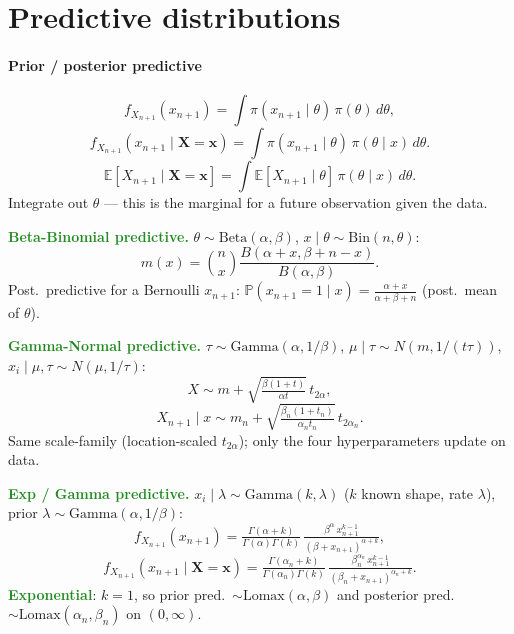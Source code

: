 
\section{Predictive distributions}

\paragraph{Prior / posterior predictive}
\[f_{X_{n+1}}(x_{n+1})=\int \pi(x_{n+1}\mid\theta)\,\pi(\theta)\,d\theta,\]
\[f_{X_{n+1}}(x_{n+1}\mid\mathbf{X}=\mathbf{x})=\int \pi(x_{n+1}\mid \theta)\,\pi(\theta\mid x)\,d\theta.\]
\[\mathbb{E}[X_{n+1}\mid\mathbf{X}=\mathbf{x}]=\int\mathbb{E}[X_{n+1}\mid\theta]\,\pi(\theta\mid x)\,d\theta.\]
\textcolor{Bittersweet}{Integrate out $\theta$} — this is the marginal for a future observation given the data.

\textcolor{ForestGreen}{\textbf{Beta-Binomial predictive.}} $\theta\sim\mathrm{Beta}(\alpha,\beta)$, $x\mid\theta\sim\mathrm{Bin}(n,\theta)$:
\[m(x)=\binom{n}{x}\frac{B(\alpha+x,\beta+n-x)}{B(\alpha,\beta)}.\]
Post.\ predictive for a Bernoulli $x_{n+1}$: $\mathbb{P}(x_{n+1}=1\mid x)=\tfrac{\alpha+x}{\alpha+\beta+n}$ (post.\ mean of $\theta$).

\textcolor{ForestGreen}{\textbf{Gamma-Normal predictive.}} $\tau\sim\mathrm{Gamma}(\alpha,1/\beta)$, $\mu\mid\tau\sim N(m,1/(t\tau))$, $x_i\mid\mu,\tau\sim N(\mu,1/\tau)$:
\[X\sim m+\!\sqrt{\tfrac{\beta(1+t)}{\alpha t}}\,t_{2\alpha},\]
\[X_{n+1}\mid x\sim m_n+\!\sqrt{\tfrac{\beta_n(1+t_n)}{\alpha_n t_n}}\,t_{2\alpha_n}.\]
\textcolor{Bittersweet}{Same scale-family} (location-scaled $t_{2\alpha}$); only the four hyperparameters update on data.

\textcolor{ForestGreen}{\textbf{Exp / Gamma predictive.}} $x_i\mid\lambda\sim\mathrm{Gamma}(k,\lambda)$ ($k$ known shape, rate $\lambda$), prior $\lambda\sim\mathrm{Gamma}(\alpha,1/\beta)$:
\[f_{X_{n+1}}(x_{n+1})=\tfrac{\Gamma(\alpha+k)}{\Gamma(\alpha)\Gamma(k)}\,\tfrac{\beta^{\alpha}\,x_{n+1}^{k-1}}{(\beta+x_{n+1})^{\alpha+k}},\]
\[f_{X_{n+1}}(x_{n+1}\mid\mathbf{X}=\mathbf{x})=\tfrac{\Gamma(\alpha_n+k)}{\Gamma(\alpha_n)\Gamma(k)}\,\tfrac{\beta_n^{\alpha_n}\,x_{n+1}^{k-1}}{(\beta_n+x_{n+1})^{\alpha_n+k}}.\]
\textcolor{ForestGreen}{\textbf{Exponential}}: $k=1$, so prior pred.\ $\sim\mathrm{Lomax}(\alpha,\beta)$ and posterior pred.\ $\sim\mathrm{Lomax}(\alpha_n,\beta_n)$ on $(0,\infty)$.
